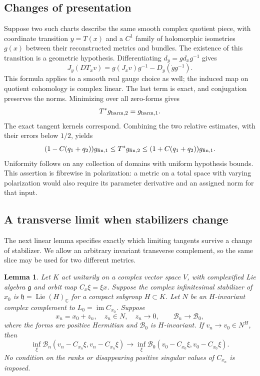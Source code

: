 \documentclass[11pt]{amsart}
\newtheorem{lemma}[theorem]{Lemma}
\theoremstyle{definition}
\theoremstyle{remark}
\newcommand{\CC}{\mathbb C}
\newcommand{\im}{\operatorname{im}}
\newcommand{\Lie}{\operatorname{Lie}}
\begin{document}
\subsection{Changes of presentation}
Suppose two such charts describe the same smooth complex quotient piece,
with coordinate transition $y=T(x)$ and a $C^1$ family of holomorphic
isometries $g(x)$ between their reconstructed metrics and bundles.
The existence of this transition is a geometric hypothesis.
Differentiating $d_y=g d_xg^{-1}$ gives
\begin{equation}\label{eq:transition-ks}
 J_y(DT_xv)=g(J_xv)g^{-1}-D_y(\dot g g^{-1}).
\end{equation}
This formula applies to a smooth real gauge choice as well; the induced
map on quotient cohomology is complex linear. The last term is exact,
and conjugation preserves the norms. Minimizing over all zero-forms gives
\begin{equation}\label{eq:actual-isometry}
 T^*g_{{\rm harm},2}=g_{{\rm harm},1}.
\end{equation}
The exact tangent kernels correspond. Combining the two relative
estimates, with their errors below $1/2$, yields
\begin{equation}\label{eq:finite-transition}
 (1-C(q_1+q_2))g_{{\rm fin},1}
 \le T^*g_{{\rm fin},2}
 \le(1+C(q_1+q_2))g_{{\rm fin},1}.
\end{equation}
Uniformity follows on any collection of domains with uniform hypothesis
bounds. This assertion is fibrewise in polarization: a metric on a total
space with varying polarization would also require its parameter derivative
and an assigned norm for that input.

\subsection{A transverse limit when stabilizers change}
The next linear lemma specifies exactly which limiting tangents survive
a change of stabilizer. We allow an arbitrary invariant transverse
complement, so the same slice may be used for two different metrics.

\begin{lemma}\label{lem:transverse-limit}
Let $K$ act unitarily on a complex vector space $V$, with complexified
Lie algebra $\mathfrak g$ and orbit map $C_x\xi=\xi x$.
Suppose the complex infinitesimal stabilizer of $x_0$ is
$\mathfrak h=\Lie(H)_{\CC}$ for a compact subgroup $H\subset K$.
Let $N$ be an $H$-invariant complex complement to
$L_0=\im C_{x_0}$. Suppose
\[
 x_n=x_0+z_n,\quad z_n\in N,\quad z_n\to0,\qquad
 \mathcal B_n\to\mathcal B_0,
\]
where the forms are positive Hermitian and $\mathcal B_0$ is
$H$-invariant. If $v_n\to v_0\in N^H$, then
\begin{equation}\label{eq:transverse-limit}
 \inf_\xi\mathcal B_n(v_n-C_{x_n}\xi,v_n-C_{x_n}\xi)
 \longrightarrow
 \inf_\xi\mathcal B_0(v_0-C_{x_0}\xi,v_0-C_{x_0}\xi).
\end{equation}
No condition on the ranks or disappearing positive singular values
of $C_{x_n}$ is imposed.
\end{lemma}
\end{document}
